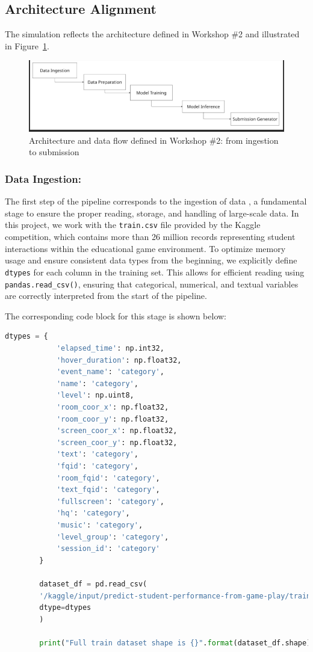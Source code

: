 \documentclass[12pt]{article}
\begin{document}
	\subsection{Architecture Alignment}
	The simulation reflects the architecture defined in Workshop \#2 and illustrated in Figure~\ref{fig:pipeline}.
	
	\begin{figure}[H]
		\centering
		\includegraphics[width=0.9\linewidth]{src/pipeline.png}
		\caption{Architecture and data flow defined in Workshop \#2: from ingestion to submission}
		\label{fig:pipeline}
	\end{figure}
	
	
	\subsubsection{Data Ingestion:}
	The first step of the pipeline corresponds to the ingestion of data \textbf{}, a fundamental stage to ensure the proper reading, storage, and handling of large-scale data. In this project, we work with the \texttt{train.csv} file provided by the Kaggle competition, which contains more than 26 million records representing student interactions within the educational game environment.
	To optimize memory usage and ensure consistent data types from the beginning, we explicitly define \texttt{ dtypes} for each column in the training set. This allows for efficient reading using \texttt{pandas.read\_csv()}, ensuring that categorical, numerical, and textual variables are correctly interpreted from the start of the pipeline.
	
	The corresponding code block for this stage is shown below:
	
	\begin{lstlisting}[language=Python, caption=Explicit Data Typing and Ingestion, basicstyle=\ttfamily\small]
		dtypes = {
			'elapsed_time': np.int32,
			'hover_duration': np.float32,
			'event_name': 'category',
			'name': 'category',
			'level': np.uint8,
			'room_coor_x': np.float32,
			'room_coor_y': np.float32,
			'screen_coor_x': np.float32,
			'screen_coor_y': np.float32,
			'text': 'category',
			'fqid': 'category',
			'room_fqid': 'category',
			'text_fqid': 'category',
			'fullscreen': 'category',
			'hq': 'category',
			'music': 'category',
			'level_group': 'category',
			'session_id': 'category'
		}
		
		dataset_df = pd.read_csv(
		'/kaggle/input/predict-student-performance-from-game-play/train.csv',
		dtype=dtypes
		)
		
		print("Full train dataset shape is {}".format(dataset_df.shape))
	\end{lstlisting}
	
\end{document}
